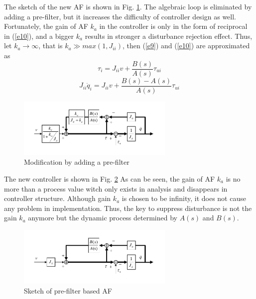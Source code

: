 \documentclass[letterpaper, 10 pt, conference]{ieeeconf}  %
\begin{document}
The sketch of the new AF is shown in Fig. \ref{f3}.
The algebraic loop is eliminated by adding a pre-filter, but it increases the difficulty of controller design as well.
Fortunately, the gain of AF $k_a$ in the controller is only in the form of reciprocal in (\ref{e10}), and a bigger $k_a$ results in stronger a disturbance rejection effect.
Thus, let $k_a\rightarrow\infty$, that is $k_a\gg max(1,J_{ii})$, then (\ref{e9}) and (\ref{e10}) are approximated as
\begin{equation}
    \tau_i = J_{ii}v+\frac{B(s)}{A(s)}\tau_{ui} \label{e11}
\end{equation}
\begin{equation}
    J_{ii}\ddot{q}_i = J_{ii}v+\frac{B(s)-A(s)}{A(s)}\tau_{ui} \label{e12}
\end{equation}
\begin{figure}[t]
    \centering
    \includegraphics[width=2.95in]{illustrations/fig3.pdf}
    \caption{Modification by adding a pre-filter}
    \label{f3}
\end{figure}

The new controller is shown in Fig. \ref{f4}
As can be seen, the gain of AF $k_a$ is no more than a process value witch only exists in analysis and disappears in controller structure.
Although gain $k_a$ is chosen to be infinity, it does not cause any problem in implementation.
Thus, the key to suppress disturbance is not the gain $k_a$ anymore but the dynamic process determined by $A(s)$ and $B(s)$.

\begin{figure}[h]
    \centering
    \includegraphics[width=2.95in]{illustrations/fig4.pdf}
    \caption{Sketch of pre-filter based AF}
    \label{f4}
\end{figure}
\end{document}
